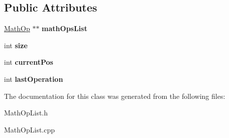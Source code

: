 \subsection*{Public Attributes}
\begin{DoxyCompactItemize}
\item 
\hypertarget{class_math_op_list_a4ac4dea48bead1d889e92b41c3d99c49}{}\hyperlink{class_math_op}{Math\+Op} $\ast$$\ast$ {\bfseries math\+Ops\+List}\label{class_math_op_list_a4ac4dea48bead1d889e92b41c3d99c49}

\item 
\hypertarget{class_math_op_list_afe8625a3d84f8654d9f0a7a91fd6f72f}{}int {\bfseries size}\label{class_math_op_list_afe8625a3d84f8654d9f0a7a91fd6f72f}

\item 
\hypertarget{class_math_op_list_a3ea410994e07a06ce9d177c639b514a2}{}int {\bfseries current\+Pos}\label{class_math_op_list_a3ea410994e07a06ce9d177c639b514a2}

\item 
\hypertarget{class_math_op_list_a7ee46ef2288f804bc6f6241e42e97093}{}int {\bfseries last\+Operation}\label{class_math_op_list_a7ee46ef2288f804bc6f6241e42e97093}

\end{DoxyCompactItemize}


The documentation for this class was generated from the following files\+:\begin{DoxyCompactItemize}
\item 
Math\+Op\+List.\+h\item 
Math\+Op\+List.\+cpp\end{DoxyCompactItemize}
